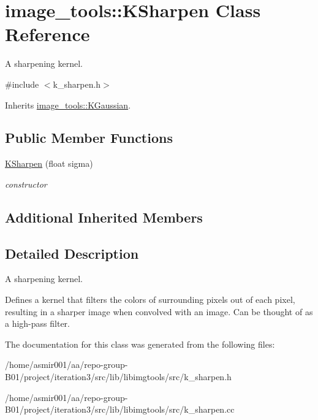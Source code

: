 \hypertarget{classimage__tools_1_1KSharpen}{}\section{image\+\_\+tools\+:\+:K\+Sharpen Class Reference}
\label{classimage__tools_1_1KSharpen}


A sharpening kernel.  




{\ttfamily \#include $<$k\+\_\+sharpen.\+h$>$}



Inherits \hyperlink{classimage__tools_1_1KGaussian}{image\+\_\+tools\+::\+K\+Gaussian}.

\subsection*{Public Member Functions}
\begin{DoxyCompactItemize}
\item 
\hyperlink{classimage__tools_1_1KSharpen_a5b50c63c031ccab6508297b4601c9f56}{K\+Sharpen} (float sigma)\hypertarget{classimage__tools_1_1KSharpen_a5b50c63c031ccab6508297b4601c9f56}{}\label{classimage__tools_1_1KSharpen_a5b50c63c031ccab6508297b4601c9f56}

\begin{DoxyCompactList}\small\item\em constructor \end{DoxyCompactList}\end{DoxyCompactItemize}
\subsection*{Additional Inherited Members}


\subsection{Detailed Description}
A sharpening kernel. 

Defines a kernel that filters the colors of surrounding pixels out of each pixel, resulting in a sharper image when convolved with an image. Can be thought of as a high-\/pass filter. 

The documentation for this class was generated from the following files\+:\begin{DoxyCompactItemize}
\item 
/home/asmir001/aa/repo-\/group-\/\+B01/project/iteration3/src/lib/libimgtools/src/k\+\_\+sharpen.\+h\item 
/home/asmir001/aa/repo-\/group-\/\+B01/project/iteration3/src/lib/libimgtools/src/k\+\_\+sharpen.\+cc\end{DoxyCompactItemize}
